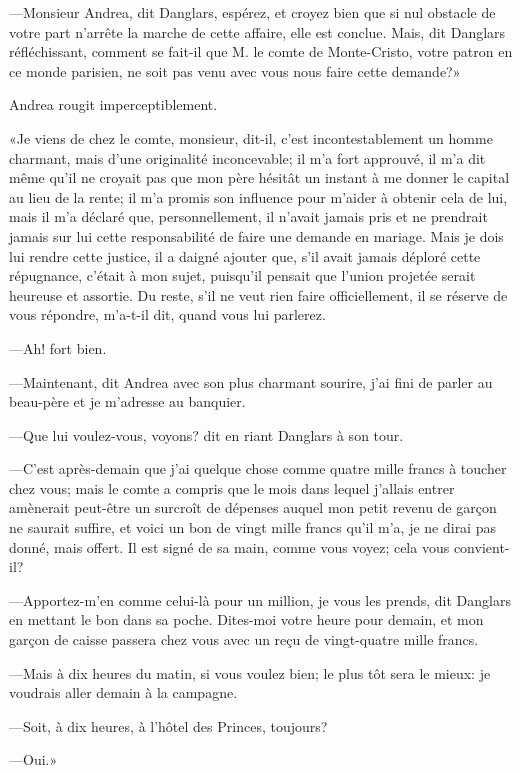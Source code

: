 —Monsieur Andrea, dit Danglars, espérez, et croyez bien que si nul obstacle de votre part n'arrête la marche de cette affaire, elle est conclue. Mais, dit Danglars réfléchissant, comment se fait-il que M. le comte de Monte-Cristo, votre patron en ce monde parisien, ne soit pas venu avec vous nous faire cette demande?» 

Andrea rougit imperceptiblement. 

«Je viens de chez le comte, monsieur, dit-il, c'est incontestablement un homme charmant, mais d'une originalité inconcevable; il m'a fort approuvé, il m'a dit même qu'il ne croyait pas que mon père hésitât un instant à me donner le capital au lieu de la rente; il m'a promis son influence pour m'aider à obtenir cela de lui, mais il m'a déclaré que, personnellement, il n'avait jamais pris et ne prendrait jamais sur lui cette responsabilité de faire une demande en mariage. Mais je dois lui rendre cette justice, il a daigné ajouter que, s'il avait jamais déploré cette répugnance, c'était à mon sujet, puisqu'il pensait que l'union projetée serait heureuse et assortie. Du reste, s'il ne veut rien faire officiellement, il se réserve de vous répondre, m'a-t-il dit, quand vous lui parlerez. 

—Ah! fort bien. 

—Maintenant, dit Andrea avec son plus charmant sourire, j'ai fini de parler au beau-père et je m'adresse au banquier. 

—Que lui voulez-vous, voyons? dit en riant Danglars à son tour. 

—C'est après-demain que j'ai quelque chose comme quatre mille francs à toucher chez vous; mais le comte a compris que le mois dans lequel j'allais entrer amènerait peut-être un surcroît de dépenses auquel mon petit revenu de garçon ne saurait suffire, et voici un bon de vingt mille francs qu'il m'a, je ne dirai pas donné, mais offert. Il est signé de sa main, comme vous voyez; cela vous convient-il? 

—Apportez-m'en comme celui-là pour un million, je vous les prends, dit Danglars en mettant le bon dans sa poche. Dites-moi votre heure pour demain, et mon garçon de caisse passera chez vous avec un reçu de vingt-quatre mille francs. 

—Mais à dix heures du matin, si vous voulez bien; le plus tôt sera le mieux: je voudrais aller demain à la campagne. 

—Soit, à dix heures, à l'hôtel des Princes, toujours? 

—Oui.» 

